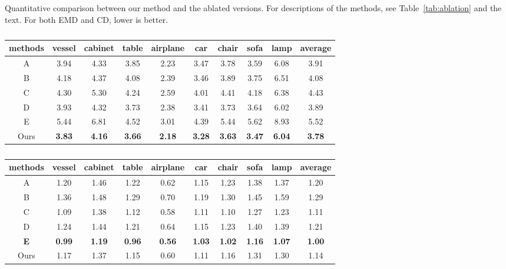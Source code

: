 \documentclass[letterpaper]{article} \usepackage{aaai20}  \usepackage{times}  \usepackage{helvet} \usepackage{courier}  \usepackage[hyphens]{url}  \usepackage{graphicx} \urlstyle{rm} \def\UrlFont{\rm}  \usepackage{graphicx}  \frenchspacing  \setlength{\pdfpagewidth}{8.5in}  \setlength{\pdfpageheight}{11in}  \usepackage{amsmath}
\begin{document}
\begin{table}[t] 
\caption{Quantitative comparison between our method and the ablated versions. For descriptions of the methods, see Table~\ref{tab:ablation} and the text.  For both EMD and CD, lower is better.}  
\label{tab:ablation_result}
\centering  
\small
\begin{subtable}{\linewidth}
\centering       
\setlength{\tabcolsep}{1.5pt}
    \begin{tabular}{c|cccccccc|c}
    \hline
    {\small methods}    & {\scriptsize vessel} & {\scriptsize cabinet} & {\scriptsize table} & {\scriptsize airplane} & {\scriptsize car} & {\scriptsize chair} & {\scriptsize sofa} & {\scriptsize lamp} & {\small average} \\
    \hline
    A     & 3.94  & 4.33  & 3.85  & 2.23  & 3.47  & 3.78  & 3.59  & 6.08  & 3.91  \\
    B     & 4.18  & 4.37  & 4.08  & 2.39  & 3.46  & 3.89  & 3.75  & 6.51  & 4.08  \\
    C     & 4.30  & 5.30  & 4.24  & 2.59  & 4.01  & 4.41  & 4.18  & 6.38  & 4.43  \\
    D & 3.93 & 4.32 & 3.73 & 2.38 & 3.41 & 3.73 & 3.64 & 6.02 & 3.89 \\ 
    E     & 5.44  & 6.81  & 4.52  & 3.01  & 4.39  & 5.44  & 5.62  & 8.93  & 5.52  \\
    Ours     & \textbf{3.83} & \textbf{4.16} & \textbf{3.66} & \textbf{2.18} & \textbf{3.28} & \textbf{3.63} & \textbf{3.47} & \textbf{6.04} & \textbf{3.78} \\
    \hline
    \end{tabular}\caption{}
\end{subtable}  

\begin{subtable}{\linewidth}
\centering    
    \setlength{\tabcolsep}{1.5pt}
    \begin{tabular}{c|cccccccc|c}
    \hline
    {\small methods}    & {\scriptsize vessel} & {\scriptsize cabinet} & {\scriptsize table} & {\scriptsize airplane} & {\scriptsize car} & {\scriptsize chair} & {\scriptsize sofa} & {\scriptsize lamp} & {\small average} \\
    \hline
    A     & 1.20  & 1.46  & 1.22  & 0.62  & 1.15  & 1.23  & 1.38  & 1.37  & 1.20  \\
    B     & 1.36  & 1.48  & 1.29  & 0.70  & 1.19  & 1.30  & 1.45  & 1.59  & 1.29  \\
    C     & 1.09  & 1.38  & 1.12  & 0.58  & 1.11  & 1.10  & 1.27  & 1.23  & 1.11  \\
    D & 1.24 & 1.44 & 1.21 & 0.64 & 1.15 & 1.23 & 1.40 & 1.39 & 1.21 \\ 
    \textbf{E}     & \textbf{0.99} & \textbf{1.19} & \textbf{0.96} & \textbf{0.56} & \textbf{1.03} & \textbf{1.02} & \textbf{1.16} & \textbf{1.07} & \textbf{1.00} \\
	Ours     & 1.17  & 1.37  & 1.15  & 0.60  & 1.11  & 1.16  & 1.31  & 1.30  & 1.14  \\
    \hline
    \end{tabular}\caption{}
\end{subtable}  
\end{table}  
\end{document}
